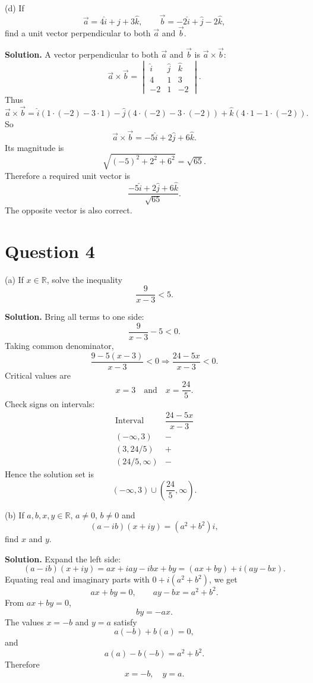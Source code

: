 \documentclass[11pt,a4paper]{article}
\newcommand{\question}[1]{\vspace{0.4em}\begin{tcolorbox}[colback=gray!8,colframe=black!55,title=Question,fonttitle=\bfseries]#1\end{tcolorbox}}
\newcommand{\answer}{\textbf{Solution. }}
\newcommand{\R}{\mathbb{R}}
\begin{document}
\question{(d) If
\[
\vec a=4\hat i+\hat j+3\hat k,
\qquad
\vec b=-2\hat i+\hat j-2\hat k,
\]
find a unit vector perpendicular to both $\vec a$ and $\vec b$.}
\answer
A vector perpendicular to both $\vec a$ and $\vec b$ is $\vec a\times\vec b$:
\[
\vec a\times\vec b=
\begin{vmatrix}
\hat i&\hat j&\hat k\\
4&1&3\\
-2&1&-2
\end{vmatrix}.
\]
Thus
\[
\vec a\times\vec b=\hat i(1\cdot(-2)-3\cdot1)-\hat j(4\cdot(-2)-3\cdot(-2))+\hat k(4\cdot1-1\cdot(-2)).
\]
So
\[
\vec a\times\vec b=-5\hat i+2\hat j+6\hat k.
\]
Its magnitude is
\[
\sqrt{(-5)^2+2^2+6^2}=\sqrt{65}.
\]
Therefore a required unit vector is
\[
\boxed{\frac{-5\hat i+2\hat j+6\hat k}{\sqrt{65}}}.
\]
The opposite vector is also correct.

\section*{Question 4}

\question{(a) If $x\in\R$, solve the inequality
\[
\frac9{x-3}<5.
\]}
\answer
Bring all terms to one side:
\[
\frac9{x-3}-5<0.
\]
Taking common denominator,
\[
\frac{9-5(x-3)}{x-3}<0
\Rightarrow
\frac{24-5x}{x-3}<0.
\]
Critical values are
\[
x=3\quad \text{and}\quad x=\frac{24}{5}.
\]
Check signs on intervals:
\[
\begin{array}{c|c}
\text{Interval} & \dfrac{24-5x}{x-3}\\\hline
(-\infty,3) & - \\
(3,24/5) & + \\
(24/5,\infty) & -
\end{array}
\]
Hence the solution set is
\[
\boxed{(-\infty,3)\cup\left(\frac{24}{5},\infty\right)}.
\]
\begin{center}
\end{center}

\question{(b) If $a,b,x,y\in\R$, $a\ne0$, $b\ne0$ and
\[
(a-ib)(x+iy)=(a^2+b^2)i,
\]
find $x$ and $y$.}
\answer
Expand the left side:
\[
(a-ib)(x+iy)=ax+iay-ibx+by=(ax+by)+i(ay-bx).
\]
Equating real and imaginary parts with $0+i(a^2+b^2)$, we get
\[
ax+by=0,
\qquad
ay-bx=a^2+b^2.
\]
From $ax+by=0$,
\[
by=-ax.
\]
The values $x=-b$ and $y=a$ satisfy
\[
a(-b)+b(a)=0,
\]
and
\[
a(a)-b(-b)=a^2+b^2.
\]
Therefore
\[
\boxed{x=-b,\quad y=a}.
\]
\end{document}
